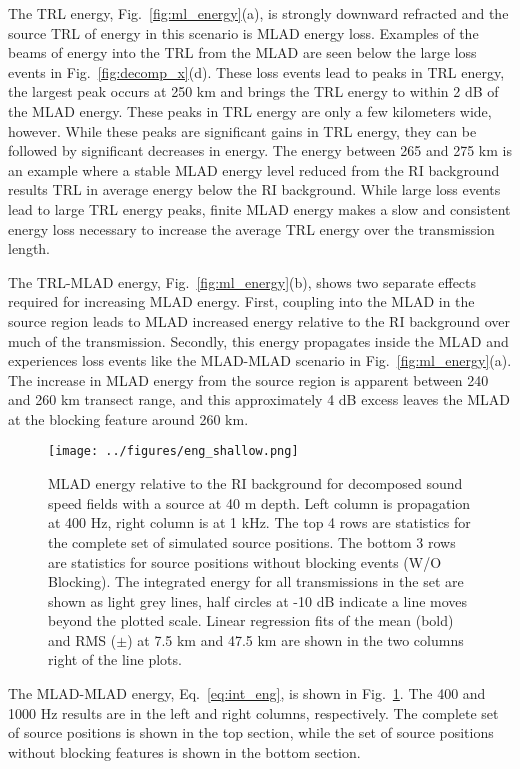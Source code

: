 \documentclass[preprint,NumberedRefs]{JASA}
\begin{document}
The TRL energy, Fig.~\ref{fig:ml_energy}(a), is strongly downward refracted and the source TRL of energy in this scenario is MLAD energy loss. Examples of the beams of energy into the TRL from the MLAD are seen below the large loss events in Fig.~\ref{fig:decomp_x}(d). These loss events lead to peaks in TRL energy, the largest peak occurs at 250 km and brings the TRL energy to within 2 dB of the MLAD energy. These peaks in TRL energy are only a few kilometers wide, however. While these peaks are significant gains in TRL energy, they can be followed by significant decreases in energy. The energy between 265 and 275 km is an example where a stable MLAD energy level reduced from the RI background results TRL in average energy below the RI background. While large loss events lead to large TRL energy peaks, finite MLAD energy makes a slow and consistent energy loss necessary to increase the average TRL energy over the transmission length.

The TRL-MLAD energy, Fig.~\ref{fig:ml_energy}(b), shows two separate effects required for increasing MLAD energy. First, coupling into the MLAD in the source region leads to MLAD increased energy relative to the RI background over much of the transmission. Secondly, this energy propagates inside the MLAD and experiences loss events like the MLAD-MLAD scenario in Fig.~\ref{fig:ml_energy}(a). The increase in MLAD energy from the source region is apparent between 240 and 260 km transect range, and this approximately 4 dB excess leaves the MLAD at the blocking feature around 260 km.

\begin{figure}
\texttt{[image: ../figures/eng\_shallow.png]}
    \caption{MLAD energy relative to the RI background for decomposed sound speed fields with a source at 40 m depth. Left column is propagation at 400 Hz, right column is at 1 kHz. The top 4 rows are statistics for the complete set of simulated source positions. The bottom 3 rows are statistics for source positions without blocking events (W/O Blocking). The integrated energy for all transmissions in the set are shown as light grey lines, half circles at -10 dB indicate a line moves beyond the plotted scale. Linear regression fits of the mean (bold) and RMS ($\pm$) at 7.5 km and 47.5 km are shown in the two columns right of the line plots.}
    \label{fig:shal_eng}
\end{figure}
The MLAD-MLAD energy, Eq.~\eqref{eq:int_eng}, is shown in Fig.~\ref{fig:shal_eng}. The 400 and 1000 Hz results are in the left and right columns, respectively. The complete set of source positions is shown in the top section, while the set of source positions without blocking features is shown in the bottom section.
\end{document}
